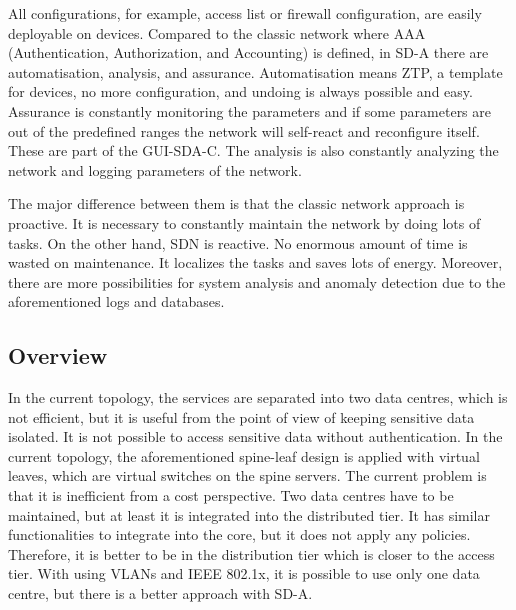 \documentclass{article}
\begin{document}
All configurations, for example, access list or firewall configuration, are easily deployable on devices. Compared to the classic network where AAA (Authentication, Authorization, and Accounting) is defined, in SD-A there are automatisation, analysis, and assurance. Automatisation means ZTP, a template for devices, no more configuration, and undoing is always possible and easy. Assurance is constantly monitoring the parameters and if some parameters are out of the predefined ranges the network will self-react and reconfigure itself. These are part of the GUI-SDA-C. The analysis is also constantly analyzing the network and logging parameters of the network.

The major difference between them is that the classic network approach is proactive. It is necessary to constantly maintain the network by doing lots of tasks. On the other hand, SDN is reactive. No enormous amount of time is wasted on maintenance. It localizes the tasks and saves lots of energy. Moreover, there are more possibilities for system analysis and anomaly detection due to the aforementioned logs and databases.

\subsection{Overview}
In the current topology,  the services are separated into two data centres, which is not efficient, but it is useful from the point of view of keeping sensitive data isolated. It is not possible to access sensitive data without authentication. In the current topology, the aforementioned spine-leaf design is applied with virtual leaves, which are virtual switches on the spine servers. The current problem is that it is inefficient from a cost perspective. Two data centres have to be maintained, but at least it is integrated into the distributed tier. It has similar functionalities to integrate into the core, but it does not apply any policies. Therefore, it is better to be in the distribution tier which is closer to the access tier. With using VLANs and IEEE 802.1x, it is possible to use only one data centre, but there is a better approach with SD-A.
\end{document}

